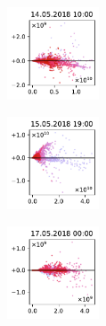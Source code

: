 \begin{figure}[H]
    \centering
    \begin{subfigure}
        \centering
        \includegraphics[width=0.30\textwidth,valign=t]{evaluation/figures/perturbations/perturbation-14.05.2018:10.00-sesquiterpenes-mul-1.01.pdf}
    \end{subfigure}
    \begin{subfigure}
        \centering
        \includegraphics[width=0.30\textwidth,valign=t]{evaluation/figures/perturbations/perturbation-15.05.2018:19.00-sesquiterpenes-mul-1.01.pdf}
    \end{subfigure}
    \begin{subfigure}
        \centering
        \includegraphics[width=0.30\textwidth,valign=t]{evaluation/figures/perturbations/perturbation-17.05.2018:00.00-sesquiterpenes-mul-1.01.pdf}
    \end{subfigure}


\end{figure}
